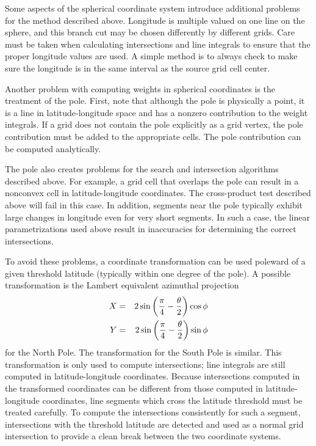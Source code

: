 \begin{description}

     Some aspects of the spherical coordinate system introduce additional
     problems for the method described above.  Longitude is multiple valued
     on one line on the sphere, and this branch cut may be chosen differently
     by different grids.  Care must be taken when calculating intersections 
     and line integrals to ensure that the proper longitude values are used.
     A simple method is to always check to make sure the longitude is in the
     same interval as the source grid cell center.

     Another problem with computing weights in spherical coordinates is the
     treatment of the pole.  First, note that although the pole is physically
     a point, it is a line in latitude-longitude space and has a nonzero
     contribution to the weight integrals.  If a grid does not contain the
     pole explicitly as a grid vertex, the pole contribution must be added
     to the appropriate cells.  The pole contribution can be computed analytically.

     The pole also creates problems for the search and intersection algorithms
     described above.  For example, a grid cell that overlaps the pole can
     result in a nonconvex cell in latitude-longitude coordinates.  The
     cross-product test described above will fail in this case.  In addition,
     segments near the pole typically exhibit large changes in longitude even
     for very short segments.  In such a case, the linear parametrizations used
     above result in inaccuracies for determining the correct intersections.

     To avoid these problems, a coordinate transformation can be used poleward
     of a given threshold latitude (typically within one degree of the pole).
     A possible transformation is the Lambert equivalent azimuthal projection
\begin{eqnarray}
X &=& 2\sin\left({\pi \over 4} - {\theta \over 2}\right)\cos\phi \nonumber \\
Y &=& 2\sin\left({\pi \over 4} - {\theta \over 2}\right)\sin\phi 
\end{eqnarray}
     for the North Pole.  The transformation for the South Pole is similar.
     This transformation is only used to compute intersections; line integrals
     are still computed in latitude-longitude coordinates.  Because intersections
     computed in the transformed coordinates can be different from those computed
     in latitude-longitude coordinates, line segments which cross the latitude
     threshold must be treated carefully.  To compute the intersections
     consistently for such a segment, intersections with the threshold latitude
     are detected and used as a normal grid intersection to provide a clean break
     between the two coordinate systems.


\end{description}
